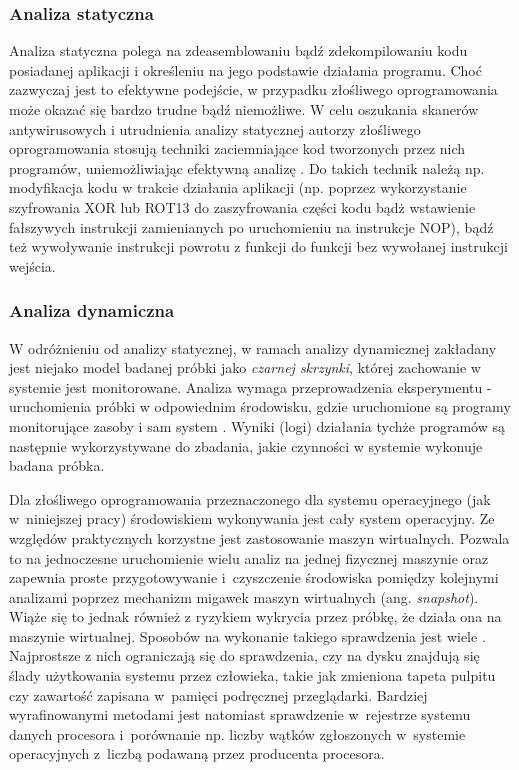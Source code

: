 \documentclass[a4paper,12pt,oneside]{article}
\begin{document}
	\subsubsection{Analiza statyczna}	
	Analiza statyczna polega na zdeasemblowaniu bądź zdekompilowaniu kodu posiadanej aplikacji i określeniu na jego podstawie działania programu. Choć zazwyczaj jest to efektywne podejście, w przypadku złośliwego oprogramowania może okazać się bardzo trudne bądź niemożliwe. W celu oszukania skanerów antywirusowych i utrudnienia analizy statycznej autorzy złośliwego oprogramowania stosują techniki zaciemniające kod tworzonych przez nich programów, uniemożliwiając efektywną analizę \cite{book-malware, for-dynamic-anal, for-antivm-antidbg}. Do takich technik należą np. modyfikacja kodu w trakcie działania aplikacji (np. poprzez wykorzystanie szyfrowania XOR lub ROT13 do zaszyfrowania części kodu bądż wstawienie fałszywych instrukcji zamienianych po uruchomieniu na instrukcje NOP),
	bądź też wywoływanie instrukcji powrotu z funkcji do funkcji bez wywołanej instrukcji wejścia.
	
	\subsubsection{Analiza dynamiczna}		
	W odróżnieniu od analizy statycznej, w ramach analizy dynamicznej zakładany jest niejako model badanej próbki jako \textit{czarnej skrzynki}, której zachowanie w systemie jest monitorowane. Analiza wymaga przeprowadzenia eksperymentu - uruchomienia próbki w odpowiednim środowisku, gdzie uruchomione są programy monitorujące zasoby i sam system \cite{for-dynamic-anal}. Wyniki (logi) działania tychże programów są następnie wykorzystywane do zbadania, jakie czynności w systemie wykonuje badana próbka.
	
	Dla złośliwego oprogramowania przeznaczonego dla systemu operacyjnego (jak w~niniejszej pracy) środowiskiem wykonywania jest cały system operacyjny. Ze względów praktycznych korzystne jest zastosowanie maszyn wirtualnych. Pozwala to na jednoczesne uruchomienie wielu analiz na jednej fizycznej maszynie oraz zapewnia proste przygotowywanie i~czyszczenie środowiska pomiędzy kolejnymi analizami poprzez mechanizm migawek maszyn wirtualnych (ang. \textit{snapshot}). Wiąże się to jednak również z ryzykiem wykrycia przez próbkę, że działa ona na maszynie wirtualnej. Sposobów na wykonanie takiego sprawdzenia jest wiele \cite{for-antivm-antidbg}. Najprostsze z nich ograniczają się do sprawdzenia, czy na dysku znajdują się ślady użytkowania systemu przez człowieka, takie jak zmieniona tapeta pulpitu czy zawartość zapisana w~pamięci podręcznej przeglądarki. Bardziej wyrafinowanymi metodami jest natomiast sprawdzenie w~rejestrze systemu danych procesora i~porównanie np. liczby wątków zgłoszonych w~systemie operacyjnych z~liczbą podawaną przez producenta procesora.
			
\end{document}
